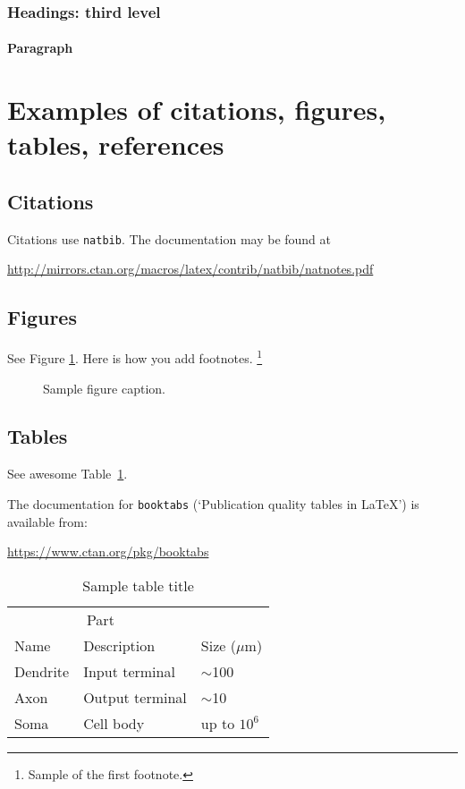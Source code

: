 \documentclass{article}
\begin{document}
\subsubsection{Headings: third level}
\lipsum[6]

\paragraph{Paragraph}
\lipsum[7]



\section{Examples of citations, figures, tables, references}
\label{sec:others}

\subsection{Citations}
Citations use \verb+natbib+. The documentation may be found at
\begin{center}
	\url{http://mirrors.ctan.org/macros/latex/contrib/natbib/natnotes.pdf}
\end{center}

\subsection{Figures}
\lipsum[10]
See Figure \ref{fig:fig1}. Here is how you add footnotes. \footnote{Sample of the first footnote.}
\lipsum[11]

\begin{figure}
	\centering

	\caption{Sample figure caption.}
	\label{fig:fig1}
\end{figure}

\subsection{Tables}
See awesome Table~\ref{tab:table}.

The documentation for \verb+booktabs+ (`Publication quality tables in LaTeX') is available from:
\begin{center}
	\url{https://www.ctan.org/pkg/booktabs}
\end{center}


\begin{table}
	\caption{Sample table title}
	\centering
	\begin{tabular}{lll}
		\toprule
		\multicolumn{2}{c}{Part}                   \\
		\cmidrule(r){1-2}
		Name     & Description     & Size ($\mu$m) \\
		\midrule
		Dendrite & Input terminal  & $\sim$100     \\
		Axon     & Output terminal & $\sim$10      \\
		Soma     & Cell body       & up to $10^6$  \\
		\bottomrule
	\end{tabular}
	\label{tab:table}
\end{table}
\end{document}
